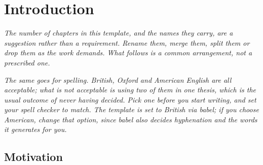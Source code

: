 %

\blankpage
\setcounter{page}{1}

\chapter{Introduction}
\label{sec:introduction}

\emph{The number of chapters in this template, and the names they carry, are a
suggestion rather than a requirement. Rename them, merge them, split them or
drop them as the work demands. What follows is a common arrangement, not a prescribed one.}

\emph{The same goes for spelling. British, Oxford and American English are all
acceptable; what is not acceptable is using two of them in one thesis, which is
the usual outcome of never having decided. Pick one before you start writing,
and set your spell checker to match. The template is set to British
via babel; if you choose American, change that option, since babel also decides
hyphenation and the words it generates for you.}

\section{Motivation}
\label{sec:motivation}

%
%

